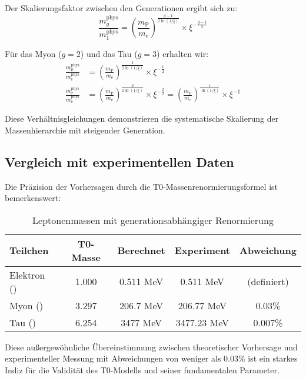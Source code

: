 \documentclass[12pt,a4paper]{article}
\newcommand{\ee}{\text{$\mathrm{e}$}}
\newcommand{\mmu}{\text{$\mu$}}
\newcommand{\ttau}{\text{$\tau$}}
\theoremstyle{definition}
\begin{document}
\begin{verhaltnis}
	Der Skalierungsfaktor zwischen den Generationen ergibt sich zu:
	\begin{equation}
		\frac{m_g^{\text{phys}}}{m_1^{\text{phys}}} = \left(\frac{m_{\text{P}}}{m_{\text{e}}}\right)^{\frac{g-1}{2\ln(1/\xi)}} \times \xi^{-\frac{g-1}{2}}
	\end{equation}
	
	Für das Myon ($g = 2$) und das Tau ($g = 3$) erhalten wir:
	\begin{align}
		\frac{m_{\mmu}^{\text{phys}}}{m_{\ee}^{\text{phys}}} &= \left(\frac{m_{\text{P}}}{m_{\text{e}}}\right)^{\frac{1}{2\ln(1/\xi)}} \times \xi^{-\frac{1}{2}} \\
		\frac{m_{\ttau}^{\text{phys}}}{m_{\ee}^{\text{phys}}} &= \left(\frac{m_{\text{P}}}{m_{\text{e}}}\right)^{\frac{2}{2\ln(1/\xi)}} \times \xi^{-\frac{2}{2}} = \left(\frac{m_{\text{P}}}{m_{\text{e}}}\right)^{\frac{1}{\ln(1/\xi)}} \times \xi^{-1}
	\end{align}
	
	Diese Verhältnisgleichungen demonstrieren die systematische Skalierung der Massenhierarchie mit steigender Generation.
\end{verhaltnis}

\subsection{Vergleich mit experimentellen Daten}

Die Präzision der Vorhersagen durch die T0-Massenrenormierungsformel ist bemerkenswert:

\begin{table}[htbp]
	\centering
	\begin{tabular}{lcccc}
		\toprule
		\textbf{Teilchen} & \textbf{T0-Masse} & \textbf{Berechnet} & \textbf{Experiment} & \textbf{Abweichung} \\
		\midrule
		Elektron (\ee) & 1.000 & 0.511 MeV & 0.511 MeV & (definiert) \\
		Myon (\mmu) & 3.297 & 206.7 MeV & 206.77 MeV & 0.03\% \\
		Tau (\ttau) & 6.254 & 3477 MeV & 3477.23 MeV & 0.007\% \\
		\bottomrule
	\end{tabular}
	\caption{Leptonenmassen mit generationsabhängiger Renormierung}
\end{table}

Diese außergewöhnliche Übereinstimmung zwischen theoretischer Vorhersage und experimenteller Messung mit Abweichungen von weniger als 0.03\% ist ein starkes Indiz für die Validität des T0-Modells und seiner fundamentalen Parameter.
\end{document}

